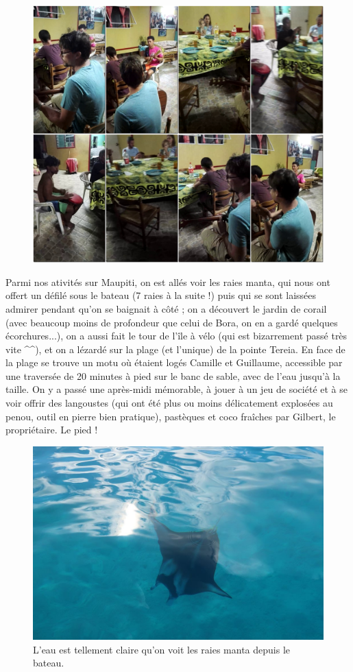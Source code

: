 \begin{figure}
\centering
\includegraphics{montage/polynesie.jpg}
\end{figure}

Parmi nos ativités sur Maupiti, on est allés voir les raies manta, qui
nous ont offert un défilé sous le bateau (7 raies à la suite !) puis qui
se sont laissées admirer pendant qu'on se baignait à côté ; on a
découvert le jardin de corail (avec beaucoup moins de profondeur que
celui de Bora, on en a gardé quelques écorchures...), on a aussi fait le
tour de l'île à vélo (qui est bizarrement passé très vite \^{}\^{}), et
on a lézardé sur la plage (et l'unique) de la pointe Tereia. En face de
la plage se trouve un motu où étaient logés Camille et Guillaume,
accessible par une traversée de 20 minutes à pied sur le banc de sable,
avec de l'eau jusqu'à la taille. On y a passé une après-midi mémorable,
à jouer à un jeu de société et à se voir offrir des langoustes (qui ont
été plus ou moins délicatement explosées au penou, outil en pierre bien
pratique), pastèques et coco fraîches par Gilbert, le propriétaire. Le
pied !

\begin{figure}
\centering
\includegraphics{images/20180820_raiemanta.JPG}
\caption{L'eau est tellement claire qu'on voit les raies manta depuis le
bateau.}
\end{figure}

